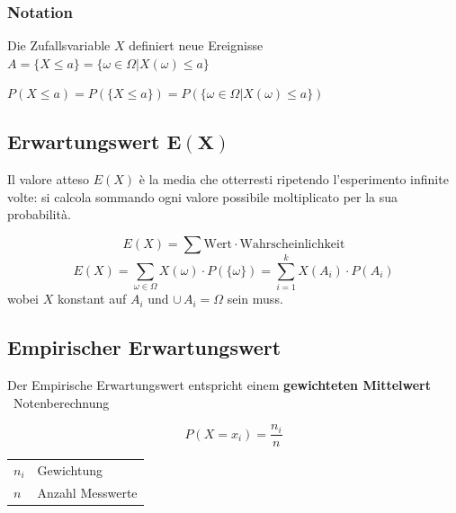 \subsubsection{Notation}


\vspace{0.1cm}

Die Zufallsvariable $X$ definiert neue Ereignisse \\
$A = \{ X \leq a  \} = \{ \omega \in \Omega | X(\omega) \leq a \}$ 

\vspace{0.2cm}


\vspace{0.1cm}

$P(X \leq a) = P( \{ X \leq a  \}) = P( \{ \omega \in \Omega | X(\omega) \leq a \} )$ 



\subsection[Erwartungswert]{Erwartungswert  $\bm{E(X)}$} 

Il valore atteso $E(X)$ è la media che otterresti ripetendo l'esperimento infinite volte: si calcola sommando ogni valore possibile moltiplicato per la sua probabilità.

$$  \boxed{ E(X) =\sum \text{Wert} \cdot \text{Wahrscheinlichkeit} } $$
$$ E(X) = \sum\limits_{\omega \in \Omega} X(\omega) \cdot P(\{ \omega \} ) = \sum\limits_{i=1}^k X(A_i) \cdot P(A_i)  $$ 
wobei $X$ konstant auf $A_i$ und $\cup \, A_i = \Omega$ sein muss.


\subsection{Empirischer Erwartungswert}

Der Empirische Erwartungswert entspricht einem \textbf{gewichteten Mittelwert} \\
\textrightarrow\ Notenberechnung

\begin{minipage}[c]{0.48\columnwidth}
	$$ P(X = x_i) = \frac{n_i}{n} $$
\end{minipage}
\hfill
\begin{minipage}[c]{0.48\columnwidth}
	\begin{tabular}{ll}
		$n_i$	& Gewichtung 		\\
		$n$ 	& Anzahl Messwerte
	\end{tabular}
\end{minipage}

